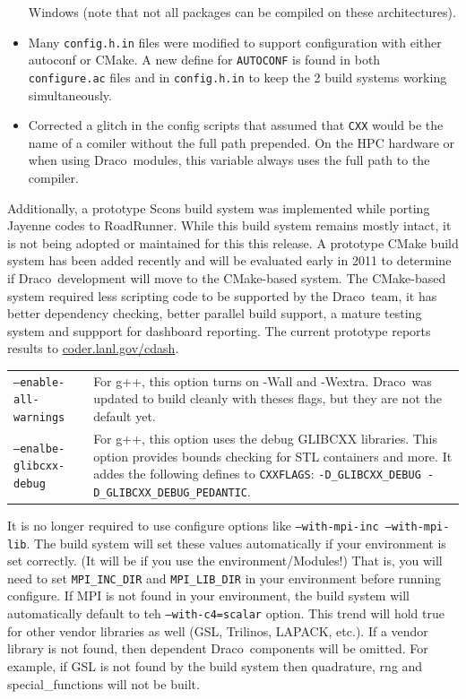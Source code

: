 \documentclass[note]{ResearchNote}
\newcommand{\draco}{Draco}
\newcommand{\tableText}[1]{{\raggedright #1}}
\begin{document}
\begin{itemize}
  Windows (note that not all packages can be compiled on these
  architectures).
\item Many \texttt{config.h.in} files were modified to support
  configuration with either \textsf{autoconf} or \textsf{CMake}. A new
  define for \texttt{AUTOCONF} is found in both \texttt{configure.ac}
  files and in \texttt{config.h.in} to keep the 2 build systems
  working simultaneously.
\item Corrected a glitch in the config scripts that assumed that
  \texttt{CXX} would be the name of a comiler without the full path
  prepended.  On the HPC hardware or when using \draco\ modules, this
  variable always uses the full path to the compiler.
\end{itemize}

Additionally, a prototype \textsf{Scons} build system was implemented
while porting Jayenne codes to RoadRunner.  While this build system
remains mostly intact, it is not being adopted or maintained for this
this release. A prototype \textsf{CMake} build system has been added
recently and will be evaluated early in 2011 to determine if
\draco\ development will move to the CMake-based system.  The
CMake-based system required less scripting code to be supported by the
\draco\ team, it has better dependency checking, better parallel build
support, a mature testing system and suppport for dashboard
reporting.  The current prototype reports results to
\url{coder.lanl.gov/cdash}. 

\begin{center}
  \footnotesize
  \begin{tabular}{lp{4.0in}}
\texttt{--enable-all-warnings} & 
     \tableText{For g++, this option turns on -Wall and -Wextra.
       \draco\ was updated to build cleanly with theses flags, but
       they are not the default yet.} \\ 
\texttt{--enalbe-glibcxx-debug} &
     \tableText{For g++, this option uses the debug GLIBCXX
       libraries.  This option provides bounds checking for STL
       containers and more.  It addes the following defines to
       \texttt{CXXFLAGS}: \texttt{-D\_GLIBCXX\_DEBUG
         -D\_GLIBCXX\_DEBUG\_PEDANTIC}. } \\
  \end{tabular}
\end{center}

It is no longer required to use configure options like
\texttt{--with-mpi-inc --with-mpi-lib}.  The build system will set
these values automatically if your environment is set correctly. (It
will be if you use the environment/Modules!)  That is, you will need
to set \texttt{MPI\_INC\_DIR} and \texttt{MPI\_LIB\_DIR} in your
environment before running configure.  If MPI is not found in your
environment, the build system will automatically default to teh
\texttt{--with-c4=scalar} option.  This trend will hold true for other
vendor libraries as well (GSL, Trilinos, LAPACK, etc.).  If a vendor
library is not found, then dependent \draco\ components will be
omitted.  For example, if GSL is not found by the build system then
\textsf{quadrature}, \textsf{rng} and \textsf{special\_functions} will
not be built.
\end{document}
